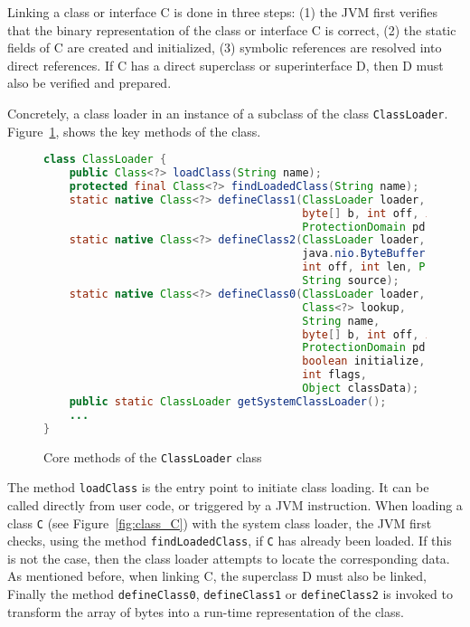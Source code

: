Linking a class or interface C is done in three steps: (1) the JVM first verifies that the binary representation of the class or interface C is correct, (2) the static fields of C are created and initialized, (3) symbolic references are resolved into direct references. If C has a direct superclass or superinterface D, then D must also be verified and prepared. 

Concretely, a class loader in an instance of a subclass of the class \verb|ClassLoader|. 
Figure~\ref{fig:classloader}, shows the key methods of the class.

\begin{figure}[ht]
    \centering
\begin{lstlisting}[language=Java]
class ClassLoader {
    public Class<?> loadClass(String name);
    protected final Class<?> findLoadedClass(String name);
    static native Class<?> defineClass1(ClassLoader loader, String name, 
                                        byte[] b, int off, int len,
                                        ProtectionDomain pd, String source);
    static native Class<?> defineClass2(ClassLoader loader, String name, 
                                        java.nio.ByteBuffer b,
                                        int off, int len, ProtectionDomain pd,
                                        String source);
    static native Class<?> defineClass0(ClassLoader loader,
                                        Class<?> lookup,
                                        String name,
                                        byte[] b, int off, int len,
                                        ProtectionDomain pd,
                                        boolean initialize,
                                        int flags,
                                        Object classData);
    public static ClassLoader getSystemClassLoader();
    ...
}
\end{lstlisting}
    \caption{Core methods of the \texttt{ClassLoader} class}
    \label{fig:classloader}
\end{figure}


The method \verb|loadClass| is the entry point to initiate class loading. It can be called directly from user code, or triggered by a JVM instruction.
When loading a class \verb|C| (see Figure~\ref{fig:class_C}) with the system class loader, the JVM first checks, using the method \verb|findLoadedClass|, if \verb|C| has already been loaded. If this is not the case, then the class loader attempts to locate the corresponding data. As mentioned before, when linking C, the superclass D must also be linked, Finally the method \verb|defineClass0|, \verb|defineClass1| or \verb|defineClass2| is invoked to transform the array of bytes into a run-time representation of the class.

